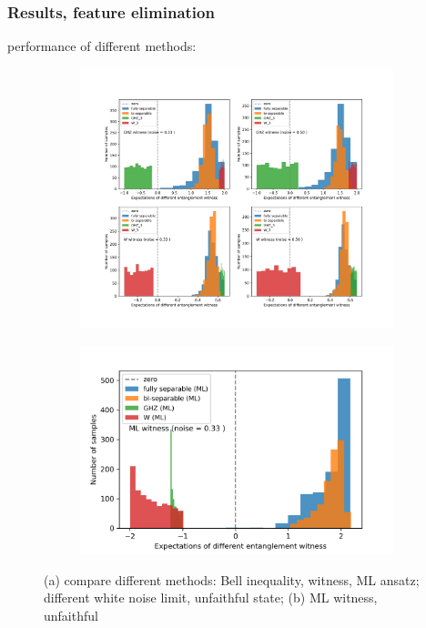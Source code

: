 \documentclass[
aps,
pra,
floatfix,
]{revtex4-2}
\theoremstyle{plain}
\theoremstyle{definition}
\begin{document}
\subsubsection{Results, feature elimination}
performance of different methods: 
\begin{figure}[!ht]
	\centering
	\begin{subfigure}{0.45\textwidth}
	\centering
		\includegraphics[width=.98\linewidth]{./Code/fidelity_witness_compare.png}
	\end{subfigure}
	\begin{subfigure}{0.52\textwidth}
	\centering
		\includegraphics[width=.95\linewidth]{./Code/three_qubit_hist_.png}
	\end{subfigure}
	\caption{(a) compare different methods: Bell inequality, witness, ML ansatz; different white noise limit, unfaithful state; (b) ML witness, unfaithful}
\end{figure}
\end{document}
